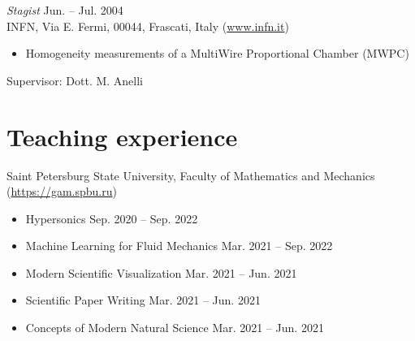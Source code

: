 \documentclass[11pt]{res} %
\begin{document}
\begin{resume}
{\sl Stagist} \hfill  Jun. -- Jul. 2004 \\
INFN, Via E. Fermi, 00044, Frascati, Italy (\url{www.infn.it}) \\
\vspace{-0.4cm}
\begin{itemize} \itemsep -2pt
\item Homogeneity measurements of a MultiWire Proportional Chamber (MWPC)
\end{itemize}
\vspace{-0.4cm}
Supervisor: Dott. M. Anelli


\section{{Teaching experience}} 
Saint Petersburg State University, Faculty of Mathematics and Mechanics (\url{https://gam.spbu.ru})\\
\vspace{-0.4cm}

\begin{itemize} \itemsep -15pt
\item Hypersonics \hfill Sep. 2020 -- Sep. 2022 \\
\item Machine Learning for Fluid Mechanics \hfill Mar. 2021 -- Sep. 2022 \\
\item Modern Scientific Visualization \hfill Mar. 2021 -- Jun. 2021 \\
\item Scientific Paper Writing \hfill Mar. 2021 -- Jun. 2021 \\
\item Concepts of Modern Natural Science \hfill Mar. 2021 -- Jun. 2021
\end{itemize}



\end{resume}
\end{document}
